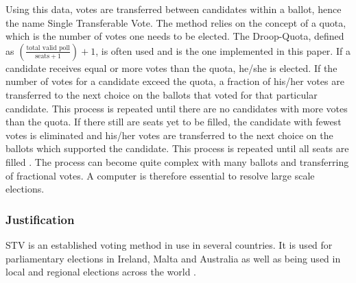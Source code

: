 \documentclass[12pt]{article}
\begin{document}
Using this data, votes are transferred between candidates within a ballot, hence the name Single Transferable Vote. The method relies on the concept of a quota, which is the number of votes one needs to be elected. The Droop-Quota, defined as $(\frac{\text{total valid poll}}{\text{seats} + 1})+1$, is often used and is the one implemented in this paper. If a candidate receives equal or more votes than the quota, he/she is elected. If the number of votes for a candidate exceed the quota, a fraction of his/her votes are transferred to the next choice on the ballots that voted for that particular candidate. This process is repeated until there are no candidates with more votes than the quota. If there still are seats yet to be filled, the candidate with fewest votes is eliminated and his/her votes are transferred to the next choice on the ballots which supported the candidate. This process is repeated until all seats are filled \autocite{king200}. The process can become quite complex with many ballots and transferring of fractional votes. A computer is therefore essential to resolve large scale elections.
\subsubsection{Justification}
STV is an established voting method in use in several countries. It is used for parliamentary elections in Ireland, Malta and Australia as well as being used in local and regional elections across the world \autocite{tideman1995single}.
\end{document}
